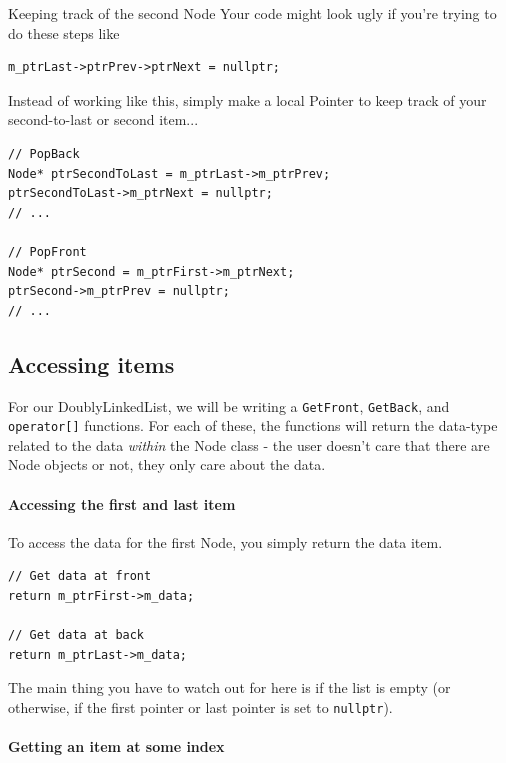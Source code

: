 \documentclass[a4paper,12pt,oneside]{book}
\begin{document}
            \begin{hint}{Keeping track of the second Node}
                Your code might look ugly if you're trying to do these steps like
\begin{verbatim}
m_ptrLast->ptrPrev->ptrNext = nullptr;
\end{verbatim}
                
                Instead of working like this, simply make a local Pointer
                to keep track of your second-to-last or second item...
                
\begin{verbatim}
// PopBack
Node* ptrSecondToLast = m_ptrLast->m_ptrPrev;
ptrSecondToLast->m_ptrNext = nullptr;
// ...

// PopFront
Node* ptrSecond = m_ptrFirst->m_ptrNext;
ptrSecond->m_ptrPrev = nullptr;
// ...
\end{verbatim}                
            \end{hint}
            
    \subsection{Accessing items}
    
        For our DoublyLinkedList, we will be writing a \texttt{GetFront},
        \texttt{GetBack}, and \texttt{operator[]} functions. For each
        of these, the functions will return the data-type related to the
        data \textit{within} the Node class - the user doesn't care that
        there are Node objects or not, they only care about the data.
        
        \paragraph{Accessing the first and last item}
        To access the data for the first Node, you simply return the data item.
        
\begin{lstlisting}[style=code]
// Get data at front
return m_ptrFirst->m_data;

// Get data at back
return m_ptrLast->m_data;
\end{lstlisting}

        The main thing you have to watch out for here is if the list
        is empty (or otherwise, if the first pointer or last pointer
        is set to \texttt{nullptr}).
    
        \paragraph{Getting an item at some index}
    
\end{document}
